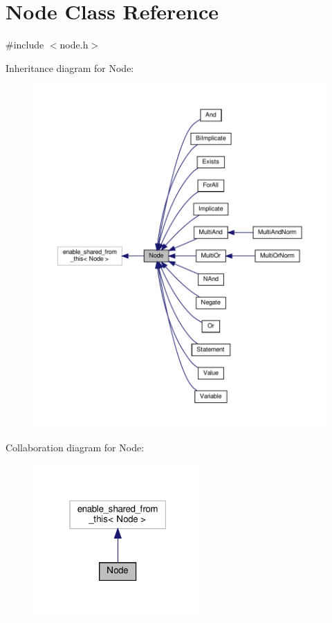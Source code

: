 \hypertarget{class_node}{}\section{Node Class Reference}
\label{class_node}


{\ttfamily \#include $<$node.\+h$>$}



Inheritance diagram for Node\+:\nopagebreak
\begin{figure}[H]
\begin{center}
\leavevmode
\includegraphics[width=350pt]{d4/db9/class_node__inherit__graph}
\end{center}
\end{figure}


Collaboration diagram for Node\+:\nopagebreak
\begin{figure}[H]
\begin{center}
\leavevmode
\includegraphics[width=184pt]{d5/dbd/class_node__coll__graph}
\end{center}
\end{figure}
